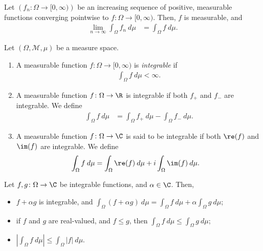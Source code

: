 \begin{theorem}
  Let $\left(f_n:\Omega\rightarrow [0,\infty)\right)$ be an increasing sequence of positive, measurable functions converging pointwise to $f\colon \Omega\rightarrow [0,\infty)$. Then, $f$ is measurable, and
  \begin{align*}
    \lim_{n\rightarrow\infty}\int_{\Omega}^{} f_n\:d\mu &= \int_{\Omega}^{} f\:d\mu.
  \end{align*}
\end{theorem}
\begin{definition}
  Let $\left(\Omega,\mathcal{M},\mu\right)$ be a measure space.
  \begin{enumerate}[(1)]
    \item A measurable function $f\colon \Omega\rightarrow [0,\infty)$ is \textit{integrable} if
      \begin{align*}
        \int_{\Omega}^{} f\:d\mu < \infty.
      \end{align*}
    \item A measurable function $f\colon \Omega\rightarrow \R$ is integrable if both $f_{+}$ and $f_{-}$ are integrable. We define
      \begin{align*}
        \int_{\Omega}^{} f\:d\mu &= \int_{\Omega}^{} f_{+}\:d\mu - \int_{\Omega}^{} f_{-}\:d\mu.
      \end{align*}
    \item A measurable function $f\colon \Omega\rightarrow \C$ is said to be integrable if both $\re(f)$ and $\im(f)$ are integrable. We define
      \begin{align*}
        \int_{\Omega}^{} f\:d\mu &= \int_{\Omega}^{} \re(f)\:d\mu + i\int_{\Omega}^{} \im(f)\:d\mu.
      \end{align*}
  \end{enumerate}
\end{definition}
\begin{fact}
  Let $f,g\colon \Omega\rightarrow \C$ be integrable functions, and $\alpha\in\C$. Then,
  \begin{itemize}
    \item $f + \alpha g$ is integrable, and $\displaystyle \int_{\Omega}^{} \left(f + \alpha g\right)\:d\mu = \int_{\Omega}f\:d\mu + \alpha\int_{\Omega}g\:d\mu$;
    \item if $f$ and $g$ are real-valued, and $f\leq g$, then $\displaystyle \int_{\Omega}^{} f\:d\mu \leq \int_{\Omega}^{} g\:d\mu$;
    \item $\displaystyle \left\vert \int_{\Omega}^{} f\:d\mu \right\vert\leq \int_{\Omega}^{} \left\vert f \right\vert\:d\mu$.
  \end{itemize}
\end{fact}
